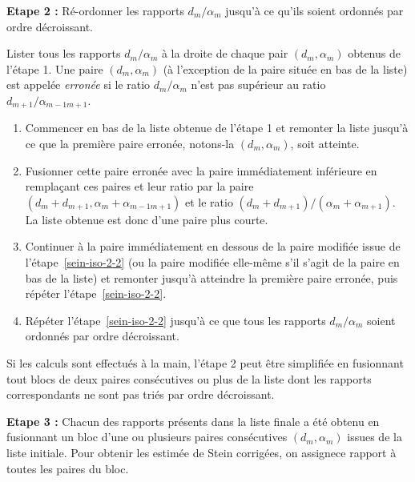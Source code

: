     \bigskip\noindent%
    \textbf{Etape 2 :} Ré-ordonner les rapports $d_m/\alpha_m$ jusqu'à ce qu'ils soient ordonnés par ordre décroissant.
    
    Lister tous les rapports $d_m/\alpha_m$ à la droite de chaque pair $(d_m, \alpha_m)$ obtenus de l'étape 1. Une paire $(d_m, \alpha_m)$ (à l'exception de la paire située en bas de la liste) est appelée \emph{erronée} si le ratio $d_m/\alpha_m$ n'est pas supérieur au ratio $d_{m+1}/\alpha_{m-1m+1}$.
    \begin{enumerate}[label={(\alph*)}]
        \item Commencer en bas de la liste obtenue de l'étape 1 et remonter la liste jusqu'à ce que la première paire erronée, notons-la $(d_m, \alpha_m)$, soit atteinte.
        \item Fusionner cette paire erronée avec la paire immédiatement inférieure en remplaçant ces paires et leur ratio par la paire $(d_m + d_{m+1},\alpha_m + \alpha_{m-1m+1})$ et le ratio $(d_m + d_{m+1})/(\alpha_m + \alpha_{m+1})$. La liste obtenue est donc d'une paire plus courte.\label{sein-iso-2-2}
        \item Continuer à la paire immédiatement en dessous de la paire modifiée issue de l'étape~\ref{sein-iso-2-2} (ou la paire modifiée elle-même s'il s'agit de la paire en bas de la liste) et remonter jusqu'à atteindre la première paire erronée, puis répéter l'étape~\ref{sein-iso-2-2}.\label{sein-iso-2-3}
        \item Répéter l'étape~\ref{sein-iso-2-2} jusqu'à ce que tous les rapports $d_m/\alpha_m$ soient ordonnés par ordre décroissant.
    \end{enumerate}
    Si les calculs sont effectués à la main, l'étape 2 peut être simplifiée en fusionnant tout blocs de deux paires consécutives ou plus de la liste dont les rapports correspondants ne sont pas triés par ordre décroissant.
    
    \bigskip\noindent%
    \textbf{Etape 3 :} Chacun des rapports présents dans la liste finale a été obtenu en fusionnant un bloc d'une ou plusieurs paires consécutives $(d_m,\alpha_m)$ issues de la liste initiale. Pour obtenir les estimée de Stein corrigées, on assignece rapport à toutes les paires du bloc.
    
